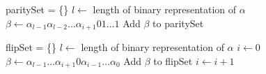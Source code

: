 \documentclass[pdftex,pra,aps,twocolumn,twoside]{revtex4-2}
\theoremstyle{plain}
\theoremstyle{note}
\newcommand\+{{\footnotesize \raisebox{0.3ex}{+}}}
\begin{document}
\begin{algorithm}[htbp]
    \caption{\label{GenerateParitySet}\textsc{GenerateParitySet}}
\begin{algorithmic}[1]
\State paritySet = \{\}
\State $l \gets $ length of binary representation of $\alpha$
        \State $\beta \gets \alpha_{l-1}\alpha_{l-2}\ldots\alpha_{i+1}01\ldots 1$
        \State Add $\beta$ to paritySet 
    \EndIf
\EndFor
\end{algorithmic}
\end{algorithm}
\begin{algorithm}[htbp]
    \caption{\label{GenerateFlipSet}\textsc{GenerateFlipSet}}
\begin{algorithmic}[1]
\State flipSet = \{\}
\State $l \gets $ length of binary representation of $\alpha$
\State $i \gets 0$
    \State $\beta \gets \alpha_{l-1}\ldots \alpha_{i+1}0\alpha_{i-1} \ldots \alpha_0$
    \State Add $\beta$ to flipSet
    \State $i \gets i + 1$
\EndWhile
\end{algorithmic}
\end{algorithm}
\pagebreak
\end{document}
